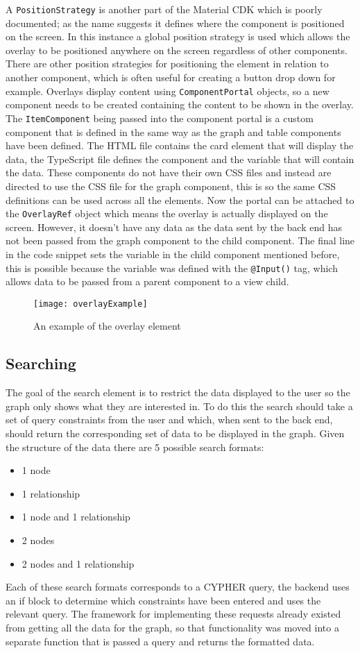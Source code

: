 A \verb|PositionStrategy| is another part of the Material CDK which is poorly documented; as the name suggests it defines where the component is positioned on the screen.
In this instance a global position strategy is used which allows the overlay to be positioned anywhere on the screen regardless of other components. There are 
other position strategies for positioning the element in relation to another component, which is often useful for creating a button drop down for example.
Overlays display content using \verb|ComponentPortal| objects, so a new component needs to be created containing the content to be shown in the overlay. 
The \verb|ItemComponent| being passed into the component portal is a custom component that is defined in the same way as the graph and table components have been defined.
The HTML file contains the card element that will display the data, the TypeScript file defines the component and the variable that will contain the data. These components do not 
have their own CSS files and instead are directed to use the CSS file for the graph component, this is so the same CSS definitions can be used across all the elements.
Now the portal can be attached to the \verb|OverlayRef| object which means the overlay is actually displayed on the screen. However, it doesn't have any data as the data sent by the 
back end has not been passed from the graph component to the child component. The final line in the code snippet sets the variable in the child component mentioned before, this is possible because 
the variable was defined with the \verb|@Input()| tag, which allows data to be passed from a parent component to a view child.
\begin{figure}[H]
    \centering
    \texttt{[image: overlayExample]}
    \caption{An example of the overlay element}
\end{figure}
\subsection{Searching}
The goal of the search element is to restrict the data displayed to the user so the graph only shows what they are interested in.
To do this the search should take a set of query constraints from the user and which, when sent to the back end, should return the 
corresponding set of data to be displayed in the graph. Given the structure of the data there are 5 possible search formats:
\begin{itemize}
    \item 1 node
    \item 1 relationship
    \item 1 node and 1 relationship
    \item 2 nodes
    \item 2 nodes and 1 relationship
\end{itemize}
Each of these search formats corresponds to a CYPHER query, the backend uses an if block to determine which constraints have been 
entered and uses the relevant query. The framework for implementing these requests already existed from getting all the data for the graph, so that 
functionality was moved into a separate function that is passed a query and returns the formatted data. 

